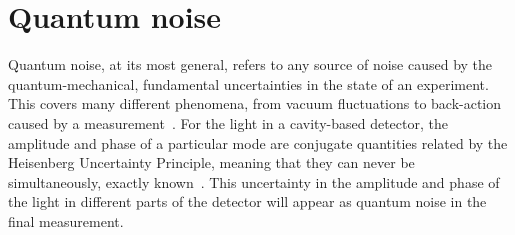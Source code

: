 \section{Quantum noise}
\label{sec:qnoise}

Quantum noise, at its most general, refers to any source of noise caused by the quantum-mechanical, fundamental uncertainties in the state of an experiment. This covers many different phenomena, from vacuum fluctuations to back-action caused by a measurement~\cite{}. For the light in a cavity-based detector, the amplitude and phase of a particular mode are conjugate quantities related by the Heisenberg Uncertainty Principle, meaning that they can never be simultaneously, exactly known~\cite{}. This uncertainty in the amplitude and phase of the light in different parts of the detector will appear as quantum noise in the final measurement. %

